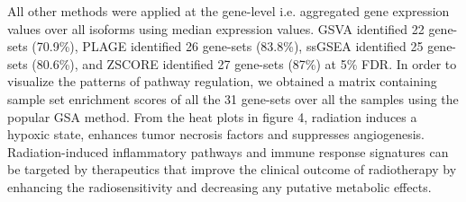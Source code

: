 \documentclass[hidelinks,11pt]{article}
\begin{document}
All other methods were applied at the gene-level i.e. aggregated gene expression values over all isoforms using median expression values. GSVA identified 22 gene-sets (70.9\%), PLAGE identified 26 gene-sets (83.8\%), ssGSEA identified 25 gene-sets (80.6\%), and ZSCORE identified 27 gene-sets (87\%) at 5\% FDR. In order to visualize the patterns of pathway regulation, we obtained a matrix containing sample set enrichment scores of all the 31 gene-sets over all the samples using the popular GSA method. From the heat plots in figure 4, radiation induces a hypoxic state, enhances tumor necrosis factors and suppresses angiogenesis. Radiation-induced inflammatory pathways and immune response signatures can be targeted by therapeutics that improve the clinical outcome of radiotherapy by enhancing the radiosensitivity and decreasing any putative metabolic effects. 

\end{document}
